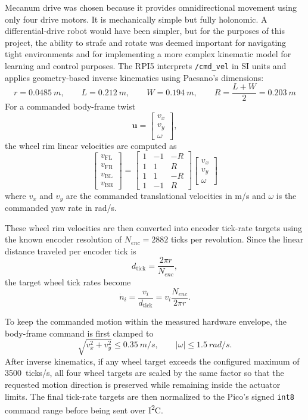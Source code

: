 \documentclass[11pt]{article}
\begin{document}
Mecanum drive was chosen because it provides omnidirectional movement using only four drive motors. It is
mechanically simple but fully holonomic. A differential-drive robot would have been simpler, but for the
purposes of this project, the ability to strafe and rotate was deemed important for navigating tight environments 
and for implementing a more complex kinematic model for learning and control purposes.
\noindent The RPI5
interprets \texttt{/cmd\_vel} in SI units and applies geometry-based inverse
kinematics using Paesano's dimensions:
\[
r = \SI{0.0485}{m}, \qquad
L = \SI{0.212}{m}, \qquad
W = \SI{0.194}{m}, \qquad
R = \frac{L+W}{2} = \SI{0.203}{m}
\]
\noindent For a commanded body-frame twist
\[
\mathbf{u} =
\begin{bmatrix}
v_x\\
v_y\\
\omega
\end{bmatrix},
\]
the wheel rim linear velocities are computed as
\begin{equation*}
\begin{bmatrix}
v_{\mathrm{FL}} \\
v_{\mathrm{FR}} \\
v_{\mathrm{BL}} \\
v_{\mathrm{BR}}
\end{bmatrix}
=
\begin{bmatrix}
1 & -1 & -R \\
1 & 1 & R \\
1 & 1 & -R \\
1 & -1 & R
\end{bmatrix}
\begin{bmatrix}
v_x \\
v_y \\
\omega
\end{bmatrix}
\end{equation*}
\noindent where $v_x$ and $v_y$ are the commanded translational velocities in
\si{m/s} and $\omega$ is the commanded yaw rate in \si{rad/s}.

\noindent These wheel rim velocities are then converted into encoder tick-rate
targets using the known encoder resolution of $N_{enc}=2882$ ticks per
revolution. Since the linear distance traveled per encoder tick is
\[
d_{\mathrm{tick}} = \frac{2\pi r}{N_{enc}},
\]
the target wheel tick rates become
\[
\dot{n}_i = \frac{v_i}{d_{\mathrm{tick}}}
=
v_i \frac{N_{enc}}{2\pi r}.
\]

\noindent To keep the commanded motion within the measured hardware envelope, the
body-frame command is first clamped to
\[
\sqrt{v_x^2 + v_y^2} \le \SI{0.35}{m/s},
\qquad
|\omega| \le \SI{1.5}{rad/s}.
\]
After inverse kinematics, if any wheel target exceeds the configured maximum of
\SI{3500}{ticks/s}, all four wheel targets are scaled by the same factor so that
the requested motion direction is preserved while remaining inside the actuator
limits. The final tick-rate targets are then normalized to the Pico's signed
\texttt{int8} command range before being sent over I\textsuperscript{2}C.
\end{document}
